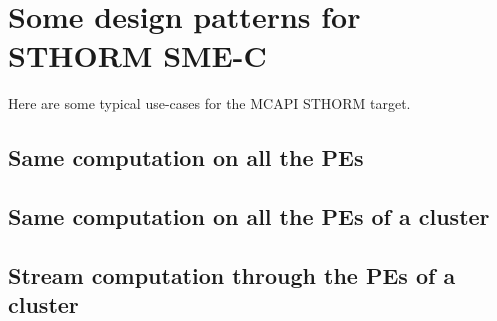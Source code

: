 \documentclass[a4paper]{article}
\begin{document}
\section{Some design patterns for STHORM SME-C}
\label{sec:examples}

Here are some typical use-cases for the MCAPI STHORM target.


\subsection{Same computation on all the PEs}
\label{sec:same-computation-all}




\subsection{Same computation on all the PEs of a cluster}
\label{sec:same-computation-all-1}




\subsection{Stream computation through the PEs of a cluster}
\label{sec:same-computation-all-1}




%
\end{document}
